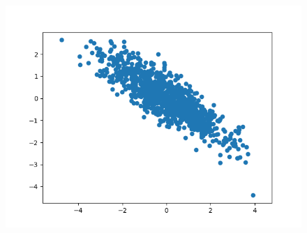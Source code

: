 \documentclass{article}
\begin{document}
\begin{figure}[H]
    \centering
    \includegraphics[width=1\textwidth]{../x-2-1.png}
        \end{figure}
\end{document}
